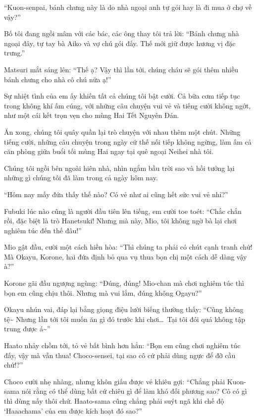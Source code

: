 \documentclass[../main.tex]{subfiles}
\begin{document}
``Kuon-senpai, bánh chưng này là do nhà ngoại anh tự gói hay là đi mua ở chợ về vậy?''

Bố tôi đang ngồi mâm với các bác, các ông thay tôi trả lời: ``Bánh chưng nhà ngoại đây, tự tay bà Aiko và vợ chú gói đấy. Thế mới giữ được hương vị đặc trưng.''

Matsuri mắt sáng lên: ``Thế ạ? Vậy thì lần tới, chúng cháu sẽ gói thêm nhiều bánh chưng cho nhà cô chú nữa ạ!''

Sự nhiệt tình của em ấy khiến tất cả chúng tôi bật cười. Cả bữa cơm tiếp tục trong không khí ấm cúng, với những câu chuyện vui vẻ và tiếng cười không ngớt, như một cái kết trọn vẹn cho mùng Hai Tết Nguyên Đán.

\ct

Ăn xong, chúng tôi quây quần lại trò chuyện với nhau thêm một chút. Những tiếng cười, những câu chuyện trong ngày cứ thế nối tiếp không ngừng, làm ấm cả căn phòng giữa buổi tối mùng Hai ngay tại quê ngoại Neihei nhà tôi.

Chúng tôi ngồi bên ngoài hiên nhà, nhìn ngắm bầu trời sao và hồi tưởng lại những gì chúng tôi đã làm trong cả ngày hôm nay.

``Hôm nay mấy đứa thấy thế nào? Có vẻ như ai cũng hết sức vui vẻ nhỉ?''

Fubuki lúc nào cũng là người đầu tiên lên tiếng, em cười toe toét: ``Chắc chắn rồi, đặc biệt là trò Hanetsuki! Nhưng mà này, Mio, tôi không ngờ bà lại chơi nghiêm túc đến thế đâu!''

Mio gật đầu, cười một cách hiền hòa: ``Thì chúng ta phải có chút cạnh tranh chứ! Mà Okayu, Korone, hai đứa định bỏ qua vụ thua bọn chị một cách dễ dàng vậy à?''

Korone gãi đầu ngượng ngùng: ``Đúng, đúng! Mio-chan mà chơi nghiêm túc thì bọn em cũng chịu thôi. Nhưng mà vui lắm, đúng không Ogayu?''

Okayu nhún vai, đáp lại bằng giọng điệu lười biếng thường thấy: ``Cũng không tệ\~{} Nhưng lần tới tôi muốn ăn gì đó trước khi chơi\dots\ Tại tôi đói quá không tập trung được á\~{}''

Haato nhảy chồm tới, tỏ vẻ bất bình hơn hẳn: ``Bọn em cũng chơi nghiêm túc đấy, vậy mà vẫn thua! Choco-sensei, tại sao cô cứ phải dùng ngực để đỡ cầu chứ!?''

Choco cười nhẹ nhàng, nhưng khôn giấu được vẻ khiêu gợi: ``Chẳng phải Kuon-sama nói rằng có thể dùng bất cứ chiêu gì để làm khó đối phương sao? Cô có gì thì dùng nấy thôi chứ. Haato-sama cũng chẳng phải suýt ngã khi chế độ `Haaachama' của em được kích hoạt đó sao?''
\end{document}
